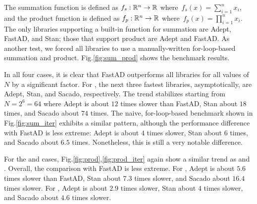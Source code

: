The summation function is defined as $f_s:\mathbb{R}^n \to \mathbb{R}$ where~$f_s(x) = \sum\limits_{i=1}^n x_i$,
and the product function is defined as $f_p:\mathbb{R}^n \to \mathbb{R}$ where~$f_p(x) = \prod\limits_{i=1}^n x_i$.
The only libraries supporting a built-in function for summation are Adept, FastAD, and Stan;
those that support product are Adept and FastAD.
As another test, we forced all libraries to use a manually-written for-loop-based summation and product.
Fig.\ref{fig:sum_prod} shows the benchmark results.

In all four cases, it is clear that FastAD outperforms all libraries for all values of $N$
by a significant factor.
For , 
the next three fastest libraries, asymptotically, are Adept, Stan, and Sacado, respectively.
The trend stabilizes starting from $N=2^6=64$ where Adept is about $ 12$ times slower than
FastAD, Stan about $ 18$ times, and Sacado about $ 74$ times.
The naive, for-loop-based benchmark shown in Fig.\ref{fig:sum_iter} exhibits a similar pattern,
although the performance difference with FastAD is less extreme:
Adept is about $ 4$ times slower, 
Stan about $ 6$ times,
and Sacado about $ 6.5$ times.
Nonetheless, this is still a very notable difference.

For the  and  cases, 
Fig.\ref{fig:prod},\ref{fig:prod_iter} again show
a similar trend as  and .
Overall, the comparison with FastAD is less extreme.
For , Adept is about $ 5.6$ times slower than FastAD,
Stan about $ 7.3$ times slower,
and Sacado about $ 16.4$ times slower.
For , Adept is about $2.9$ times slower,
Stan about $4$ times slower,
and Sacado about $4.6$ times slower.

